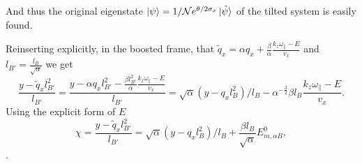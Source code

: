 And thus the original eigenstate \(\ket{\psi } = 1 /\mathcal{N} e^{\theta /2 \sigma _{x}} \ket{\tilde{\psi} }\) of the tilted system is easily found.


Reinserting explicitly, in the boosted frame, that \(\tilde{q}_{x} = \alpha q_{x} + \frac{\beta}{\alpha } \frac{k_{z} \omega _{\parallel} - E}{v_{x}} \) and \(l_{B'}=\frac{l_{B}}{\sqrt{\alpha} }\)
we get
\begin{equation}
  \label{eq:41}
  \frac{y-\tilde{q}_{x} l_{B'}^2}{l_{B'}}
  =
  \frac{y - \alpha q_{x} l_{B'}^2 - \frac{\beta l_{B'}^2}{\alpha } \frac{k_{z} \omega _{\parallel} - E}{v_{x}}}{l_{B'}}
  =
  \sqrt{\alpha } (y-q_{x} l_{B}^2) /l_{B} - \alpha^{-\frac{3}{2}}  \beta l_{B} \frac{k_{z} \omega _{\parallel} - E}{v_{x}}.
\end{equation}
Using the explicit form of \(E\)
\begin{equation}
  \label{eq:43}
  \chi =
  \frac{y-\tilde{q}_{x} l_{B'}^2}{l_{B'}}
  =
  \sqrt{\alpha } (y-q_{x} l_{B}^2) /l_{B}
  + \frac{ \beta l_B }{ \sqrt{\alpha}} E^{0}_{m, \alpha B},
\end{equation}.


